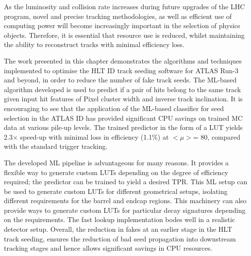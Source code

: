 As the luminosity and collision rate increases during future upgrades of the LHC program, novel and precise tracking methodologies, as well as efficient use of computing power will become increasingly important in the selection of physics objects. Therefore, it is essential that resource use is reduced, whilst maintaining the ability to reconstruct tracks with minimal efficiency loss. 

The work presented in this chapter demonstrates the algorithms and techniques implemented to optimise the HLT ID track seeding software for ATLAS Run-3 and beyond, in order to reduce the number of fake track seeds. The ML-based algorithm developed is used to predict if a pair of hits belong to the same track given input hit features of Pixel cluster width and inverse track inclination. It is encouraging to see that the application of the ML-based classifier for seed selection in the ATLAS ID has provided significant CPU savings on trained MC data at various pile-up levels. The trained predictor in the form of a LUT yields 2.3$\times$ speed-up with minimal loss in efficiency (1.1\%) at $< \mu >$= 80, compared with the standard trigger tracking. 

The developed ML pipeline is advantageous for many reasons. It provides a flexible way to generate custom LUTs depending on the degree of efficiency required; the predictor can be trained to yield a desired TPR. This ML setup can be used to generate custom LUTs for different geometrical setups, isolating different requirements for the barrel and endcap regions. This machinery can also provide ways to generate custom LUTs for particular decay signatures depending on the requirements. The fast lookup implementation bodes well in a realistic detector setup. Overall, the reduction in fakes at an earlier stage in the HLT track seeding, ensures the reduction of bad seed propagation into downstream tracking stages and hence allows significant savings in CPU resources.


